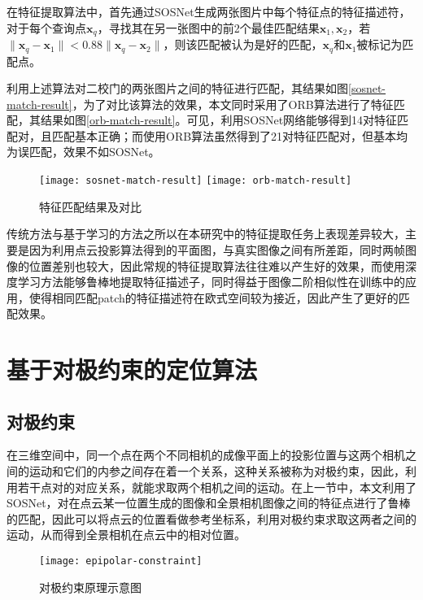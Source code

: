 在特征提取算法中，首先通过SOSNet生成两张图片中每个特征点的特征描述符，对于每个查询点$\boldsymbol{x}_q$，寻找其在另一张图中的前2个最佳匹配结果$\boldsymbol{x}_1, \boldsymbol{x}_2$，若$\|\boldsymbol{x}_q - \boldsymbol{x}_1\|<0.88\|\boldsymbol{x}_q - \boldsymbol{x}_2\|$，则该匹配被认为是好的匹配，$\boldsymbol{x}_q$和$\boldsymbol{x}_1$被标记为匹配点。

利用上述算法对二校门的两张图片之间的特征进行匹配，其结果如图\ref{sosnet-match-result}，为了对比该算法的效果，本文同时采用了ORB算法进行了特征匹配，其结果如图\ref{orb-match-result}。可见，利用SOSNet网络能够得到14对特征匹配对，且匹配基本正确；而使用ORB算法虽然得到了21对特征匹配对，但基本均为误匹配，效果不如SOSNet。
\begin{figure}
	\centering
		{\texttt{[image: sosnet-match-result]}}
	{\texttt{[image: orb-match-result]}}
	\caption{特征匹配结果及对比}
	\label{match-result}
\end{figure}

传统方法与基于学习的方法之所以在本研究中的特征提取任务上表现差异较大，主要是因为利用点云投影算法得到的平面图，与真实图像之间有所差距，同时两帧图像的位置差别也较大，因此常规的特征提取算法往往难以产生好的效果，而使用深度学习方法能够鲁棒地提取特征描述子，同时得益于图像二阶相似性在训练中的应用，使得相同匹配patch的特征描述符在欧式空间较为接近，因此产生了更好的匹配效果。

\section{基于对极约束的定位算法}
\subsection{对极约束}
在三维空间中，同一个点在两个不同相机的成像平面上的投影位置与这两个相机之间的运动和它们的内参之间存在着一个关系，这种关系被称为对极约束，因此，利用若干点对的对应关系，就能求取两个相机之间的运动。在上一节中，本文利用了SOSNet，对在点云某一位置生成的图像和全景相机图像之间的特征点进行了鲁棒的匹配，因此可以将点云的位置看做参考坐标系，利用对极约束求取这两者之间的运动，从而得到全景相机在点云中的相对位置。

\begin{figure}
	\centering
	\texttt{[image: epipolar-constraint]}
	\caption{对极约束原理示意图}
	\label{epipolar-constraint}
\end{figure}

